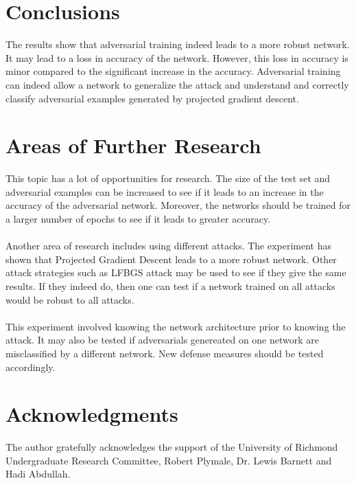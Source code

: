 \documentclass[11pt]{article}
\begin{document}
\section{Conclusions}
The results show that adversarial training indeed leads to a more robust network. It may lead to a loss in accuracy of the network. However, this loss in accuracy is minor compared to the significant increase in the accuracy. Adversarial training can indeed allow a network to generalize the attack and understand and correctly classify adversarial examples generated by projected gradient descent.

\section{Areas of Further Research}
This topic has a lot of opportunities for research. The size of the test set and adversarial examples can be increased to see if it leads to an increase in the accuracy of the adversarial network. Moreover, the networks should be trained for a larger number of epochs to see if it leads to greater accuracy. \\ \\
Another area of research includes using different attacks. The experiment has shown that Projected Gradient Descent leads to a more robust network. Other attack strategies such as LFBGS attack may be used to see if they give the same results. If they indeed do, then one can test if a network trained on all attacks would be robust to all attacks. \\ \\
This experiment involved knowing the network architecture prior to knowing the attack. It may also be tested if adversarials genereated on one network are misclassified by a different network. New defense measures should be tested accordingly.

\section{Acknowledgments}
The author gratefully acknowledges the support of
the University of Richmond Undergraduate Research Committee,
Robert Plymale, Dr. Lewis Barnett and Hadi Abdullah.

\newpage



\end{document}
